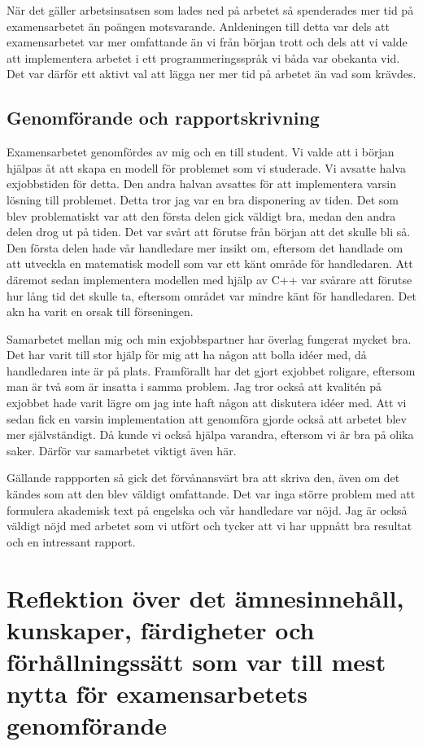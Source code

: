 \documentclass{article}
\begin{document}
När det gäller arbetsinsatsen som lades ned på arbetet så spenderades mer tid på examensarbetet än poängen motsvarande. Anldeningen till detta var dels att examensarbetet var mer omfattande än vi från början trott och dels att vi valde att implementera arbetet i ett programmeringsspråk vi båda var obekanta vid. Det var därför ett aktivt val att lägga ner mer tid på arbetet än vad som krävdes.

\subsection*{Genomförande och rapportskrivning}

Examensarbetet genomfördes av mig och en till student. Vi valde att i början hjälpas åt att skapa en modell för problemet som vi studerade. Vi avsatte halva exjobbstiden för detta. Den andra halvan avsattes för att implementera varsin lösning till problemet. Detta tror jag var en bra disponering av tiden. Det som blev problematiskt var att den första delen gick väldigt bra, medan den andra delen drog ut på tiden. Det var svårt att förutse från början att det skulle bli så. Den första delen hade vår handledare mer insikt om, eftersom det handlade om att utveckla en matematisk modell som var ett känt område för handledaren. Att däremot sedan implementera modellen med hjälp av C++ var svårare att förutse hur lång tid det skulle ta, eftersom området var mindre känt för handledaren. Det akn ha varit en orsak till förseningen.

Samarbetet mellan mig och min exjobbspartner har överlag fungerat mycket bra. Det har varit till stor hjälp för mig att ha någon att bolla idéer med, då handledaren inte är på plats. Framförallt har det gjort exjobbet roligare, eftersom man är två som är insatta i samma problem. Jag tror också att kvalitén på exjobbet hade varit lägre om jag inte haft någon att diskutera idéer med. Att vi sedan fick en varsin implementation att genomföra gjorde också att arbetet blev mer självständigt. Då kunde vi också hjälpa varandra, eftersom vi är bra på olika saker. Därför var samarbetet viktigt även här.

Gällande rappporten så gick det förvånansvärt bra att skriva den, även om det kändes som att den blev väldigt omfattande. Det var inga större problem med att formulera akademisk text på engelska och vår handledare var nöjd. Jag är också väldigt nöjd med arbetet som vi utfört och tycker att vi har uppnått bra resultat och en intressant rapport.

\section*{Reflektion över det ämnesinnehåll, kunskaper, färdigheter och förhållningssätt som var till mest nytta för examensarbetets genomförande}
\end{document}

